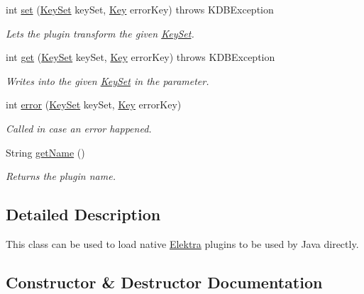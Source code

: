 \begin{DoxyCompactItemize}
int \hyperlink{classorg_1_1libelektra_1_1plugin_1_1NativePlugin_a9faeb1e6eb90a4c90681eeeb097eeb53}{set} (\hyperlink{classorg_1_1libelektra_1_1KeySet}{Key\+Set} key\+Set, \hyperlink{classorg_1_1libelektra_1_1Key}{Key} error\+Key)  throws K\+D\+B\+Exception 	
\begin{DoxyCompactList}\small\item\em Lets the plugin transform the given \hyperlink{classorg_1_1libelektra_1_1KeySet}{Key\+Set}. \end{DoxyCompactList}\item 
int \hyperlink{classorg_1_1libelektra_1_1plugin_1_1NativePlugin_a766870e5f26cab4d497ed7c2fbc4abd9}{get} (\hyperlink{classorg_1_1libelektra_1_1KeySet}{Key\+Set} key\+Set, \hyperlink{classorg_1_1libelektra_1_1Key}{Key} error\+Key)  throws K\+D\+B\+Exception 	
\begin{DoxyCompactList}\small\item\em Writes into the given \hyperlink{classorg_1_1libelektra_1_1KeySet}{Key\+Set} in the parameter. \end{DoxyCompactList}\item 
int \hyperlink{classorg_1_1libelektra_1_1plugin_1_1NativePlugin_a54c2753b1d17e14be39526a6ff02e34d}{error} (\hyperlink{classorg_1_1libelektra_1_1KeySet}{Key\+Set} key\+Set, \hyperlink{classorg_1_1libelektra_1_1Key}{Key} error\+Key)
\begin{DoxyCompactList}\small\item\em Called in case an error happened. \end{DoxyCompactList}\item 
String \hyperlink{classorg_1_1libelektra_1_1plugin_1_1NativePlugin_a606fc8f54bc810d874176103859976ab}{get\+Name} ()
\begin{DoxyCompactList}\small\item\em Returns the plugin name. \end{DoxyCompactList}\end{DoxyCompactItemize}


\subsection{Detailed Description}
This class can be used to load native \hyperlink{interfaceorg_1_1libelektra_1_1Elektra}{Elektra} plugins to be used by Java directly. 

\subsection{Constructor \& Destructor Documentation}
\mbox{\label{classorg_1_1libelektra_1_1plugin_1_1NativePlugin_ad228084d20bd57c561e49ee755e9c751}} 
